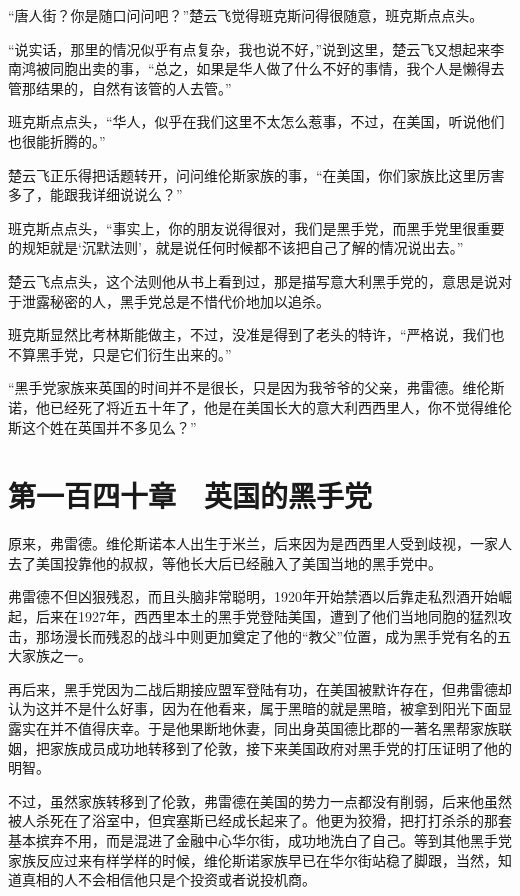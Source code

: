 “唐人街？你是随口问问吧？”楚云飞觉得班克斯问得很随意，班克斯点点头。

“说实话，那里的情况似乎有点复杂，我也说不好，”说到这里，楚云飞又想起来李南鸿被同胞出卖的事，“总之，如果是华人做了什么不好的事情，我个人是懒得去管那结果的，自然有该管的人去管。”

班克斯点点头，“华人，似乎在我们这里不太怎么惹事，不过，在美国，听说他们也很能折腾的。”

楚云飞正乐得把话题转开，问问维伦斯家族的事，“在美国，你们家族比这里厉害多了，能跟我详细说说么？”

班克斯点点头，“事实上，你的朋友说得很对，我们是黑手党，而黑手党里很重要的规矩就是‘沉默法则’，就是说任何时候都不该把自己了解的情况说出去。”

楚云飞点点头，这个法则他从书上看到过，那是描写意大利黑手党的，意思是说对于泄露秘密的人，黑手党总是不惜代价地加以追杀。

班克斯显然比考林斯能做主，不过，没准是得到了老头的特许，“严格说，我们也不算黑手党，只是它们衍生出来的。”

“黑手党家族来英国的时间并不是很长，只是因为我爷爷的父亲，弗雷德。维伦斯诺，他已经死了将近五十年了，他是在美国长大的意大利西西里人，你不觉得维伦斯这个姓在英国并不多见么？”

\section{第一百四十章　英国的黑手党}

原来，弗雷德。维伦斯诺本人出生于米兰，后来因为是西西里人受到歧视，一家人去了美国投靠他的叔叔，等他长大后已经融入了美国当地的黑手党中。

弗雷德不但凶狠残忍，而且头脑非常聪明，1920年开始禁酒以后靠走私烈酒开始崛起，后来在1927年，西西里本土的黑手党登陆美国，遭到了他们当地同胞的猛烈攻击，那场漫长而残忍的战斗中则更加奠定了他的“教父”位置，成为黑手党有名的五大家族之一。

再后来，黑手党因为二战后期接应盟军登陆有功，在美国被默许存在，但弗雷德却认为这并不是什么好事，因为在他看来，属于黑暗的就是黑暗，被拿到阳光下面显露实在并不值得庆幸。于是他果断地休妻，同出身英国德比郡的一著名黑帮家族联姻，把家族成员成功地转移到了伦敦，接下来美国政府对黑手党的打压证明了他的明智。

不过，虽然家族转移到了伦敦，弗雷德在美国的势力一点都没有削弱，后来他虽然被人杀死在了浴室中，但宾塞斯已经成长起来了。他更为狡猾，把打打杀杀的那套基本摈弃不用，而是混进了金融中心华尔街，成功地洗白了自己。等到其他黑手党家族反应过来有样学样的时候，维伦斯诺家族早已在华尔街站稳了脚跟，当然，知道真相的人不会相信他只是个投资或者说投机商。

